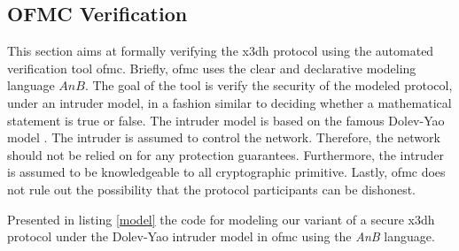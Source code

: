 \subsection{OFMC Verification}
This section aims at formally verifying the \gls{x3dh} protocol using the automated verification tool \gls{ofmc}. Briefly, \gls{ofmc} uses the clear and declarative modeling language $AnB$. The goal of the tool is verify the security of the modeled protocol, under an intruder model, in a fashion similar to deciding whether a mathematical statement is true or false. The intruder model is based on the famous Dolev-Yao model \cite{dolev1983security}. The intruder is assumed to control the network. Therefore, the network should not be relied on for any protection guarantees. Furthermore, the intruder is assumed to be knowledgeable to all cryptographic primitive. Lastly, \gls{ofmc} does not rule out the possibility that the protocol participants can be dishonest.

Presented in listing \ref{model} the code for modeling our variant of a secure \gls{x3dh} protocol under the Dolev-Yao intruder model in \gls{ofmc} using the \textit{AnB} language.



